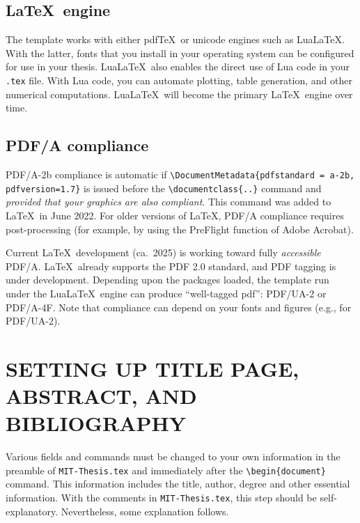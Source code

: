 \documentclass[11pt]{article}
\newcommand*\pdfTeX{pdf\TeX}
\newcommand*\LuaLaTeX{Lua\LaTeX}
\begin{document}
\subsection{\LaTeX\ engine}
The template works with either \pdfTeX\ or unicode engines such as \LuaLaTeX.  With the latter, fonts that you install in your operating system can be configured for use in your thesis. \LuaLaTeX\ also enables the direct use of Lua code in your \texttt{.tex} file. With Lua code, you can automate plotting, table generation, and other numerical computations. \LuaLaTeX\ will become the primary \LaTeX\ engine over time.

\subsection{PDF/A compliance}
PDF/A-2b compliance is automatic if \verb|\DocumentMetadata{pdfstandard = a-2b, pdfversion=1.7}| is issued before the \verb|\documentclass{..}| command and \textit{provided that your graphics are also compliant}. This command was added to \LaTeX\ in June 2022. For older versions of \LaTeX, PDF/A compliance requires post-processing (for example, by using the PreFlight function of Adobe Acrobat).  

Current \LaTeX\ development (ca.~2025) is working toward fully \textit{accessible} PDF/A. \LaTeX\ already supports the PDF 2.0 standard, and PDF tagging is under development.  Depending upon the packages loaded, the template run under the \LuaLaTeX\ engine can produce ``well-tagged pdf'': PDF/UA-2 or PDF/A-4F.  Note that compliance can depend on your fonts and figures (e.g., for PDF/UA-2).


\section{SETTING UP TITLE PAGE, ABSTRACT, AND BIBLIOGRAPHY}
Various fields and commands must be changed to your own information in the preamble of \texttt{MIT-Thesis.tex} and immediately after the \verb|\begin{document}| command. This information includes the title, author, degree and other essential information.  With the comments in \texttt{MIT-Thesis.tex}, this step should be self-explanatory. Nevertheless, some explanation follows.
\end{document}

